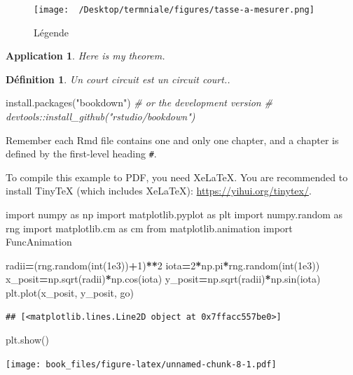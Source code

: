 \documentclass[
]{book}
\newenvironment{Shaded}{\begin{snugshade}}{\end{snugshade}}
\newcommand{\BuiltInTok}[1]{#1}
\newcommand{\CommentTok}[1]{\textcolor[rgb]{0.56,0.35,0.01}{\textit{#1}}}
\newcommand{\DecValTok}[1]{\textcolor[rgb]{0.00,0.00,0.81}{#1}}
\newcommand{\FloatTok}[1]{\textcolor[rgb]{0.00,0.00,0.81}{#1}}
\newcommand{\FunctionTok}[1]{\textcolor[rgb]{0.00,0.00,0.00}{#1}}
\newcommand{\ImportTok}[1]{#1}
\newcommand{\NormalTok}[1]{#1}
\newcommand{\OperatorTok}[1]{\textcolor[rgb]{0.81,0.36,0.00}{\textbf{#1}}}
\newcommand{\StringTok}[1]{\textcolor[rgb]{0.31,0.60,0.02}{#1}}
\newtheorem{definition}{Définition}
\newtheorem{theorem}{Application}
\begin{document}
\begin{figure}
\centering
\texttt{[image: ~/Desktop/termniale/figures/tasse-a-mesurer.png]}
\caption{Légende}
\end{figure}

\begin{theorem}
\protect\hypertarget{thm:unnamed-chunk-5}{}{\label{thm:unnamed-chunk-5} }Here is my theorem.
\end{theorem}

\begin{definition}
\protect\hypertarget{def:unnamed-chunk-6}{}{\label{def:unnamed-chunk-6} }Un court circuit est un circuit court..
\end{definition}

\begin{Shaded}
\begin{Highlighting}[]
\FunctionTok{install.packages}\NormalTok{(}\StringTok{"bookdown"}\NormalTok{)}
\CommentTok{\# or the development version}
\CommentTok{\# devtools::install\_github("rstudio/bookdown")}
\end{Highlighting}
\end{Shaded}

Remember each Rmd file contains one and only one chapter, and a chapter is defined by the first-level heading \texttt{\#}.

To compile this example to PDF, you need XeLaTeX. You are recommended to install TinyTeX (which includes XeLaTeX): \url{https://yihui.org/tinytex/}.

\begin{Shaded}
\begin{Highlighting}[]
\ImportTok{import}\NormalTok{ numpy }\ImportTok{as}\NormalTok{ np}
\ImportTok{import}\NormalTok{ matplotlib.pyplot }\ImportTok{as}\NormalTok{ plt}
\ImportTok{import}\NormalTok{ numpy.random }\ImportTok{as}\NormalTok{ rng}
\ImportTok{import}\NormalTok{ matplotlib.cm }\ImportTok{as}\NormalTok{ cm}
\ImportTok{from}\NormalTok{ matplotlib.animation }\ImportTok{import}\NormalTok{ FuncAnimation}

\NormalTok{radii}\OperatorTok{=}\NormalTok{(rng.random(}\BuiltInTok{int}\NormalTok{(}\FloatTok{1e3}\NormalTok{))}\OperatorTok{+}\DecValTok{1}\NormalTok{)}\OperatorTok{**}\DecValTok{2}
\NormalTok{iota}\OperatorTok{=}\DecValTok{2}\OperatorTok{*}\NormalTok{np.pi}\OperatorTok{*}\NormalTok{rng.random(}\BuiltInTok{int}\NormalTok{(}\FloatTok{1e3}\NormalTok{))}
\NormalTok{x\_posit}\OperatorTok{=}\NormalTok{np.sqrt(radii)}\OperatorTok{*}\NormalTok{np.cos(iota)}
\NormalTok{y\_posit}\OperatorTok{=}\NormalTok{np.sqrt(radii)}\OperatorTok{*}\NormalTok{np.sin(iota)}
\NormalTok{plt.plot(x\_posit, y\_posit, }\StringTok{\textquotesingle{}go\textquotesingle{}}\NormalTok{)}
\end{Highlighting}
\end{Shaded}

\begin{verbatim}
## [<matplotlib.lines.Line2D object at 0x7ffacc557be0>]
\end{verbatim}

\begin{Shaded}
\begin{Highlighting}[]
\NormalTok{plt.show()}
\end{Highlighting}
\end{Shaded}

\texttt{[image: book\_files/figure-latex/unnamed-chunk-8-1.pdf]}

  
\end{document}
